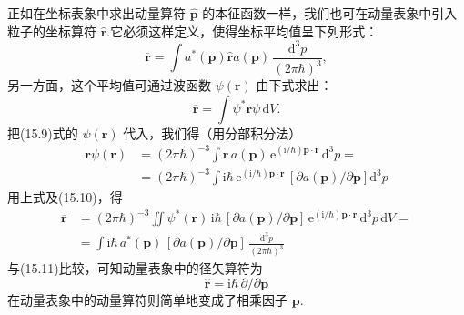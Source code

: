 正如在坐标表象中求出动量算符 $\hat{\boldsymbol{p}}$ 的本征函数一样，我们也可在动量表象中引入粒子的坐标算符 $\hat{\boldsymbol{r}}$.它必须这样定义，使得坐标平均值呈下列形式：
\begin{equation}
  \overline{\boldsymbol{r}}=\int a^{*}(\boldsymbol{p})\hat{\boldsymbol{r}}a(\boldsymbol{p})\,
  \frac{\mathrm{d}^{3}p}{(2\pi\hbar)^{3}},
\end{equation}
另一方面，这个平均值可通过波函数 $\psi(\boldsymbol{r})$ 由下式求出：
\begin{equation*}
  \overline{\boldsymbol{r}}=\int\psi^{*}\boldsymbol{r}\psi\,\mathrm{d}V.
\end{equation*}
把(15.9)式的 $\psi(\boldsymbol{r})$ 代入，我们得（用分部积分法）
\begin{equation*}
\begin{aligned}
  \boldsymbol{r}\psi(\boldsymbol{r})
  &=(2\pi\hbar)^{-3}\int\boldsymbol{r}\,a(\boldsymbol{p})\,
  \mathrm{e}^{(\mathrm{i}/\hbar)\boldsymbol{p}\cdot\boldsymbol{r}}\,\mathrm{d}^{3}p=\\
  &=(2\pi\hbar)^{-3}\int\mathrm{i}\hbar\,
  \mathrm{e}^{(\mathrm{i}/\hbar)\boldsymbol{p}\cdot\boldsymbol{r}}\,
  \left[\partial a(\boldsymbol{p})/\partial\boldsymbol{p}\right]\mathrm{d}^{3}p
\end{aligned}
\end{equation*}
用上式及(15.10)，得
\begin{equation*}
\begin{aligned}
  \overline{\boldsymbol{r}}
  &=(2\pi\hbar)^{-3}\iint\psi^{*}(\boldsymbol{r})\,\mathrm{i}\hbar\,
  \left[\partial a(\boldsymbol{p})/\partial\boldsymbol{p}\right]\,
  \mathrm{e}^{(\mathrm{i}/\hbar)\boldsymbol{p}\cdot\boldsymbol{r}}\,
  \mathrm{d}^{3}p\,\mathrm{d}V=\\
  &=\int\mathrm{i}\hbar\,a^{*}(\boldsymbol{p})\,
  \left[\partial a(\boldsymbol{p})/\partial\boldsymbol{p}\right]\,
  \frac{\mathrm{d}^{3}p}{(2\pi\hbar)^{3}}
\end{aligned}
\end{equation*}
与(15.11)比较，可知动量表象中的径矢算符为
\begin{equation}
  \hat{\boldsymbol{r}}=\mathrm{i}\hbar\,\partial/\partial\boldsymbol{p}
\end{equation}
在动量表象中的动量算符则简单地变成了相乘因子 $\boldsymbol{p}$.

